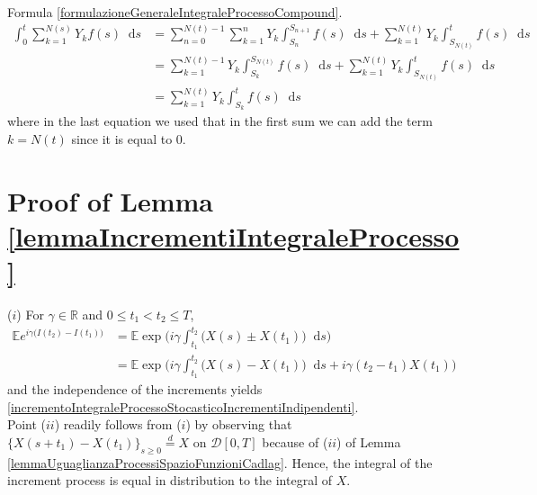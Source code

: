 \documentclass[12pt, twoside, english, headsepline]{article}
\newcommand*\dif{\mathop{}\!\mathrm{d}}  %
\theoremstyle{definition} %
\numberwithin{equation}{section} %
\begin{document}
Formula \eqref{formulazioneGeneraleIntegraleProcessoCompound}.
\begin{align*}
	\int_0^t  \sum_{k=1}^{N(s)} Y_k f(s)\dif s &=  \sum_{n=0}^{N(t)-1}  \sum_{k=1}^{n} Y_k \int_{S_n}^{S_{n+1}} f(s)\dif s + \sum_{k=1}^{N(t)} Y_k \int_{S_{N(t)}}^t f(s)\dif s \\
	& = \sum_{k=1}^{N(t)-1} Y_k  \int_{S_k}^{S_{N(t)}} f(s)\dif s  + \sum_{k=1}^{N(t)} Y_k \int_{S_{N(t)}}^t f(s)\dif s\\
	& = \sum_{k=1}^{N(t)} Y_k   \int_{S_k}^t f(s)\dif s
\end{align*}
where in the last equation we used that in the first sum we can add the term $k=N(t)$ since it is equal to $0$.


\section{Proof of Lemma \ref{lemmaIncrementiIntegraleProcesso}}\label{appendiceDimostrazioneIncrementiIntegrale}
($i$) For $\gamma\in\mathbb{R}$ and $0\le t_1<t_2\le T$,
\begin{align}
	\mathbb{E}e^{i\gamma \big(I(t_2)-I(t_1)\big)}  &=  \mathbb{E} \exp\Bigg( i\gamma \int_{t_1}^{t_2} \Big(X(s)\pm X(t_1) \Big) \dif s \Bigg) \nonumber\\
	& = \mathbb{E} \exp\Bigg( i\gamma \int_{t_1}^{t_2} \Big(X(s)- X(t_1) \Big) \dif s  +  i\gamma (t_2 - t_1) X(t_1)\Bigg) \nonumber
\end{align}
and the independence of the increments yields \eqref{incrementoIntegraleProcessoStocasticoIncrementiIndipendenti}.
\\
Point ($ii$) readily follows from ($i$) by observing that $\{X(s+t_1)-X(t_1)\}_{s\ge0} \stackrel{d}{=}X$ on $\mathcal{D}[0,T]$ because of ($ii$) of Lemma \ref{lemmaUguaglianzaProcessiSpazioFunzioniCadlag}. Hence, the integral of the increment process is equal in distribution to the integral of $X$.
\end{document}
